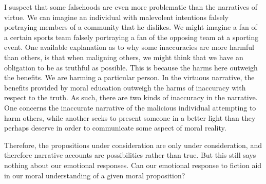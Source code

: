 \documentclass[
  12pt,
]{book}
\theoremstyle{definition}
\theoremstyle{definition}
\theoremstyle{definition}
\theoremstyle{definition}
\theoremstyle{remark}
\begin{document}
I suspect that some falsehoods are even more problematic than the narratives of virtue. We can imagine an individual with malevolent intentions falsely portraying members of a community that he dislikes. We might imagine a fan of a certain sports team falsely portraying a fan of the opposing team at a sporting event. One available explanation as to why some inaccuracies are more harmful than others, is that when maligning others, we might think that we have an obligation to be as truthful as possible. This is because the harms here outweigh the benefits. We are harming a particular person. In the virtuous narrative, the benefits provided by moral education outweigh the harms of inaccuracy with respect to the truth. As such, there are two kinds of inaccuracy in the narrative. One concerns the inaccurate narrative of the malicious individual attempting to harm others, while another seeks to present someone in a better light than they perhaps deserve in order to communicate some aspect of moral reality.

Therefore, the propositions under consideration are only under consideration, and therefore narrative accounts are possibilities rather than true. But this still says nothing about our emotional responses. Can our emotional response to fiction aid in our moral understanding of a given moral proposition?
\end{document}
